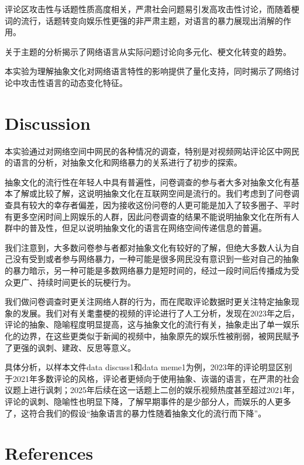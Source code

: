 \documentclass[12pt,a4paper]{ctexart}
\begin{document}
评论区攻击性与话题性质高度相关，严肃社会问题易引发高攻击性讨论，而随着梗词的流行，话题转变向娱乐性更强的非严肃主题，对语言的暴力展现出消解的作用。

关于主题的分析揭示了网络语言从实际问题讨论向多元化、梗文化转变的趋势。

本实验为理解抽象文化对网络语言特性的影响提供了量化支持，同时揭示了网络讨论中攻击性语言的动态变化特征。



\section{Discussion}
本实验通过对网络空间中网民的各种情况的调查，特别是对视频网站评论区中网民的语言的分析，对抽象文化和网络暴力的关系进行了初步的探索。

抽象文化的流行性在年轻人中具有普遍性，问卷调查的参与者大多对抽象文化有基本了解或比较了解，这说明抽象文化在互联网空间是流行的。我们考虑到了问卷调查具有较大的幸存者偏差，因为接收这份问卷的人更可能是加入了较多圈子、平时有更多空闲时间上网娱乐的人群，因此问卷调查的结果不能说明抽象文化在所有人群中的普及性，但足以说明抽象文化的语言在网络空间传递信息的普遍。

我们注意到，大多数问卷参与者都对抽象文化有较好的了解，但绝大多数人认为自己没有受到或者参与网络暴力，一种可能是很多网民没有意识到一些对自己的抽象的暴力暗示，另一种可能是多数网络暴力是短时间的，经过一段时间后传播成为受众更广、持续时间更长的玩梗行为。

我们做问卷调查时更关注网络人群的行为，而在爬取评论数据时更关注特定抽象现象的发展。我们对有关耄耋梗的视频的评论进行了人工分析，发现在2023年之后，评论的抽象、隐喻程度明显提高，这与抽象文化的流行有关，抽象走出了单一娱乐化的边界，在这些更类似于新闻的视频中，抽象原先的娱乐性被削弱，被网民赋予了更强的讽刺、建政、反思等意义。

具体分析，以样本文件data discuss1和data meme1为例，2023年的评论明显区别于2021年多数评论的风格，评论者更倾向于使用抽象、诙谐的语言，在严肃的社会议题上进行讽刺；2025年后续在这一话题上二创的娱乐视频热度甚至超过2021年，评论的讽刺、隐喻性也明显下降，了解早期事件的是少部分人，而娱乐的人更多了，这符合我们的假设“抽象语言的暴力性随着抽象文化的流行而下降”。


\section{References}
\end{document}
